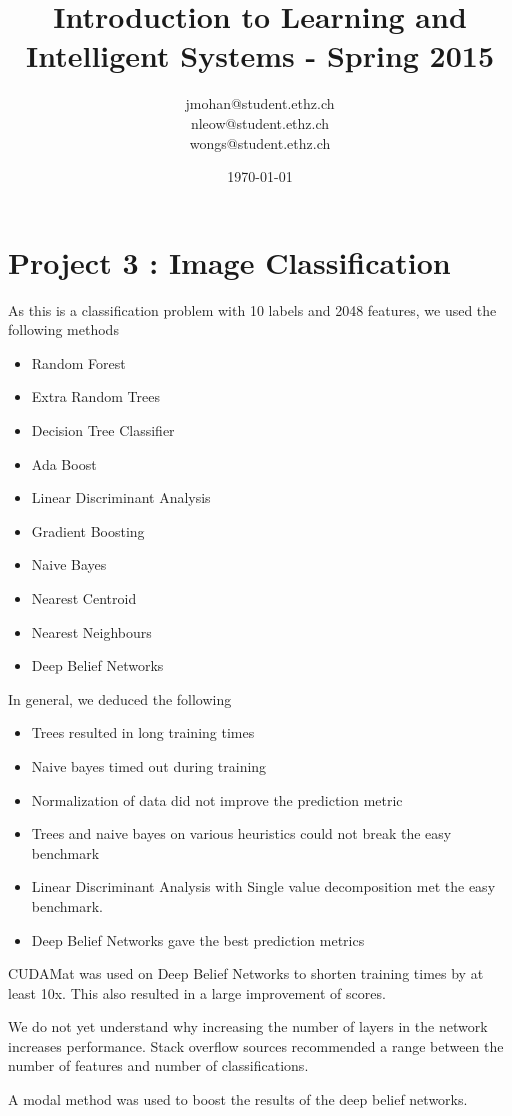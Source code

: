 \documentclass[a4paper, 11pt]{article}
\title{Introduction to Learning and Intelligent Systems - Spring 2015}
\author{jmohan@student.ethz.ch\\ nleow@student.ethz.ch\\ wongs@student.ethz.ch\\}
\date{\today}
\begin{document}
\maketitle

\section*{Project 3 : Image Classification}

As this is a classification problem with 10 labels and 2048 features, we used the following methods

\begin{itemize}
  \item Random Forest
  \item Extra Random Trees
  \item Decision Tree Classifier
  \item Ada Boost
  \item Linear Discriminant Analysis
  \item Gradient Boosting
  \item Naive Bayes
  \item Nearest Centroid
  \item Nearest Neighbours
  \item Deep Belief Networks
\end{itemize}

In general, we deduced the following
\begin{itemize}
  \item Trees resulted in long training times
  \item Naive bayes timed out during training
  \item Normalization of data did not improve the prediction metric
  \item Trees and naive bayes on various heuristics could not break the easy benchmark
  \item Linear Discriminant Analysis with Single value decomposition met the easy benchmark.
  \item Deep Belief Networks gave the best prediction metrics
\end{itemize}

CUDAMat was used on Deep Belief Networks to shorten training times by at least 10x. This also resulted in a large improvement of scores.

We do not yet understand why increasing the number of layers in the network increases performance. Stack overflow sources recommended a range between the number of features and number of classifications.

A modal method was used to boost the results of the deep belief networks.
\end{document}
